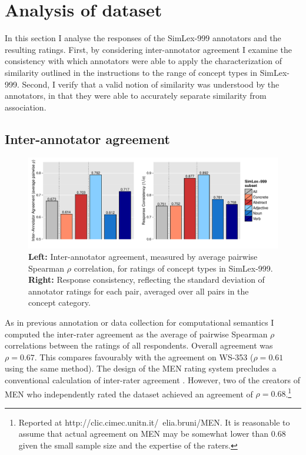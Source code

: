 \section{Analysis of dataset}
\label{analysis}
In this section I analyse the responses of the SimLex-999 annotators and the resulting ratings. First, by considering inter-annotator agreement I examine the consistency with which annotators were able to apply the characterization of similarity outlined in the instructions to the range of concept types in SimLex-999. Second, I verify that a valid notion of similarity was understood by the annotators, in that they were able to accurately separate similarity from association. 

\subsection{Inter-annotator agreement}

\begin{figure}[ht]  \includegraphics[width = \textwidth]{Chapter_2/Figure_1A_CL}  \caption{\label{fig4} {\bf Left:} Inter-annotator agreement, measured by average pairwise Spearman \(\rho\) correlation, for ratings of concept types in SimLex-999. {\bf Right:} Response consistency, reflecting the standard deviation of annotator ratings for each pair, averaged over all pairs in the concept category.}\end{figure}  

As in previous annotation or data collection for computational semantics \citep{pado2007flexible,reisinger2010mixture,silberer2014learning} I computed the inter-rater agreement as the average of pairwise Spearman \(\rho\) correlations between the ratings of all respondents. Overall agreement was \(\rho=0.67\). This compares favourably with the agreement on WS-353 (\(\rho=0.61\) using the same method). The design of the MEN rating system precludes a conventional calculation of inter-rater agreement \citep{bruni2012distributional2}. However, two of the creators of MEN who independently rated the dataset achieved an agreement of \(\rho=0.68\).\footnote{Reported at http://clic.cimec.unitn.it/~elia.bruni/MEN. It is reasonable to assume that actual agreement on MEN may be somewhat lower than 0.68 given the small sample size and the expertise of the raters.} 

